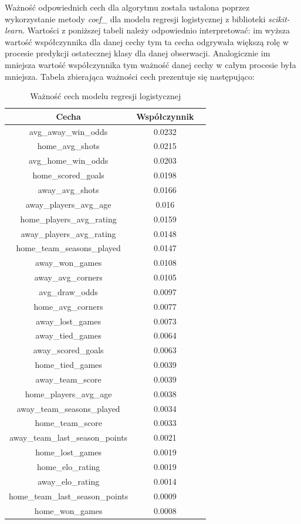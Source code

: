 Ważność odpowiednich cech dla algorytmu została ustalona poprzez wykorzystanie metody \textit{coef\_} dla modelu regresji logistycznej z biblioteki \textit{scikit-learn}. Wartości z poniższej tabeli należy odpowiednio interpretować: im wyższa wartość współczynnika dla danej cechy tym ta cecha odgrywała większą rolę w procesie predykcji ostatecznej klasy dla danej obserwacji. Analogicznie im mniejsza wartość współczynnika tym ważność danej cechy w całym procesie była mniejsza. Tabela zbierająca ważności cech prezentuje się następująco:

\begin{table}[H]
        \caption{Ważność cech modelu regresji logistycznej}
        \centering
        \begin{tabular}{c c c}
        \toprule
            Cecha & Współczynnik \\
        \midrule
            avg\_away\_win\_odds & 0.0232 \\
            home\_avg\_shots & 0.0215 \\
            avg\_home\_win\_odds & 0.0203 \\
            home\_scored\_goals & 0.0198 \\
            away\_avg\_shots & 0.0166 \\
            away\_players\_avg\_age & 0.016 \\
            home\_players\_avg\_rating & 0.0159 \\
            away\_players\_avg\_rating & 0.0148 \\
            home\_team\_seasons\_played & 0.0147 \\
            away\_won\_games & 0.0108 \\
            away\_avg\_corners & 0.0105 \\
            avg\_draw\_odds & 0.0097 \\
            home\_avg\_corners & 0.0077 \\
            away\_lost\_games & 0.0073 \\
            away\_tied\_games & 0.0064 \\
            away\_scored\_goals & 0.0063 \\
            home\_tied\_games & 0.0039 \\
            away\_team\_score & 0.0039 \\
            home\_players\_avg\_age & 0.0038 \\
            away\_team\_seasons\_played & 0.0034 \\
            home\_team\_score & 0.0033 \\
            away\_team\_last\_season\_points & 0.0021 \\
            home\_lost\_games & 0.0019 \\
            home\_elo\_rating & 0.0019 \\
            away\_elo\_rating & 0.0014 \\
            home\_team\_last\_season\_points & 0.0009 \\
            home\_won\_games & 0.0008 \\
        \bottomrule
        \end{tabular}
        \end{table}

